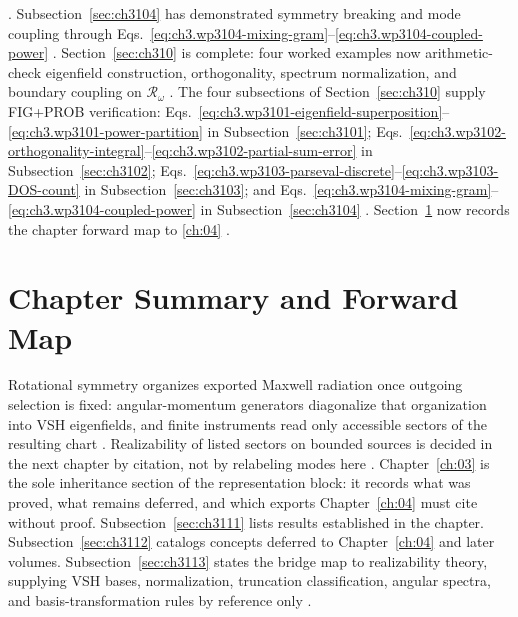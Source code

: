 \cite{harrington2001}.
Subsection~\ref{sec:ch3104} has demonstrated symmetry breaking and mode coupling through
Eqs.~\eqref{eq:ch3.wp3104-mixing-gram}--\eqref{eq:ch3.wp3104-coupled-power}
\cite{stratton1941}. Section~\ref{sec:ch310} is complete: four worked examples now arithmetic-check eigenfield
construction, orthogonality, spectrum normalization, and boundary coupling on \(\mathcal{R}_\omega\) \cite{hansen1988}.
The four subsections of Section~\ref{sec:ch310} supply FIG+PROB verification:
Eqs.~\eqref{eq:ch3.wp3101-eigenfield-superposition}--\eqref{eq:ch3.wp3101-power-partition} in Subsection~\ref{sec:ch3101};
Eqs.~\eqref{eq:ch3.wp3102-orthogonality-integral}--\eqref{eq:ch3.wp3102-partial-sum-error} in Subsection~\ref{sec:ch3102};
Eqs.~\eqref{eq:ch3.wp3103-parseval-discrete}--\eqref{eq:ch3.wp3103-DOS-count} in Subsection~\ref{sec:ch3103}; and
Eqs.~\eqref{eq:ch3.wp3104-mixing-gram}--\eqref{eq:ch3.wp3104-coupled-power} in Subsection~\ref{sec:ch3104}
\cite{hansen1988}. Section~\ref{sec:ch3inherit} now records the chapter forward map to
\ref{ch:04} \cite{devaney2004}.
\section{Chapter Summary and Forward Map}
\label{sec:ch3inherit}
Rotational symmetry organizes exported Maxwell radiation once outgoing selection is fixed: angular-momentum generators diagonalize that organization into VSH eigenfields, and finite instruments read only accessible sectors of the resulting chart \cite{maxwell1873,stratton1941,belinfante1940}. Realizability of listed sectors on bounded sources is decided in the next chapter by citation, not by relabeling modes here \cite{harrington2001}.
Chapter~\ref{ch:03} is the sole inheritance section of the representation block: it records what was proved,
what remains deferred, and which exports Chapter~\ref{ch:04} must cite without proof. Subsection~\ref{sec:ch3111}
lists results established in the chapter. Subsection~\ref{sec:ch3112} catalogs concepts deferred to
Chapter~\ref{ch:04} and later volumes. Subsection~\ref{sec:ch3113} states the bridge map to realizability theory,
supplying VSH bases, normalization, truncation classification, angular spectra, and basis-transformation rules by
reference only \cite{stratton1941}.
